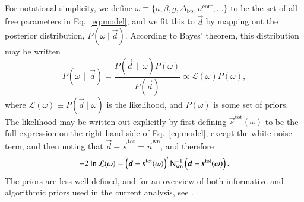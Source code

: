 \documentclass[twocolumn]{aa}
\renewcommand{\d}[0]{\vec{d}}
\newcommand{\n}[0]{\vec{n}}
\newcommand{\s}[0]{\vec{s}}
\newcommand{\N}[0]{\tens{N}}
\newcommand{\Dbp}[0]{\Delta_{\mathrm{bp}}}
\begin{document}
For notational simplicity, we define $\omega \equiv \{a, \beta, g,
\Dbp, n^{\mathrm{corr}}, \ldots\}$ to be the set of all free
parameters in Eq.~\eqref{eq:model}, and we fit this to $\d$ by
mapping out the posterior distribution, $P(\omega\mid\d)$.  According to
Bayes' theorem, this distribution may be written
\begin{equation}
  P(\omega\,\mid\,\d) = \frac{P(\d\,\mid\,\omega)P(\omega)}{P(\d)}
  \propto \mathcal{L}(\omega)P(\omega),
  \label{eq:joint_posterior_full}
\end{equation}
where $\mathcal{L}(\omega) \equiv P(\d\mid\omega)$ is the
likelihood, and $P(\omega)$ is some set of priors. The likelihood may
be written out explicitly by first defining
$\s^{\mathrm{tot}}(\omega)$ to be the full expression on the
right-hand side of Eq.~\eqref{eq:model}, except the white noise term,
and then noting that $\d-\s^{\mathrm{tot}} = \n^{\mathrm{wn}}$, and
therefore
\begin{equation}
-2\ln\mathcal{L}(\omega) = \left(\d-\s^{\mathrm{tot}}(\omega)\right)^t\N_{\mathrm{wn}}^{-1}\left(\d-\s^{\mathrm{tot}}(\omega)\right).
\end{equation}
The priors are less well defined, and for an overview of both
informative and algorithmic priors used in the current analysis, see
\citet{bp01}.
\end{document}
